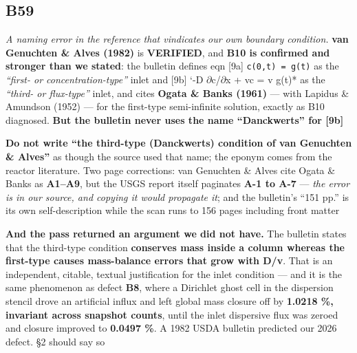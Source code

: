\documentclass[10pt]{article}
\begin{document}
\subsection*{B59}\label{led:B59}
\begin{description}[leftmargin=0pt,itemsep=1pt]
\item[Defect.] \emph{A naming error in the reference that vindicates our own boundary condition.} \textbf{van Genuchten \& Alves (1982)} is \textbf{VERIFIED}, and \textbf{B10 is confirmed and stronger than we stated}: the bulletin defines eqn [9a] \texttt{c(0,t) = g(t)} as the \emph{``first- or concentration-type''} inlet and [9b] `-D $\partial$c/$\partial$x + vc = v g(t)* as the \emph{``third- or flux-type''} inlet, and cites \textbf{Ogata \& Banks (1961)} --- with Lapidus \& Amundson (1952) --- for the first-type semi-infinite solution, exactly as B10 diagnosed. \textbf{But the bulletin never uses the name ``Danckwerts'' for [9b]}
\item[Resolution.] \textbf{Do not write ``the third-type (Danckwerts) condition of van Genuchten \& Alves''} as though the source used that name; the eponym comes from the reactor literature. Two page corrections: van Genuchten \& Alves cite Ogata \& Banks as \textbf{A1--A9}, but the USGS report itself paginates \textbf{A-1 to A-7} --- \emph{the error is in our source, and copying it would propagate it}; and the bulletin's ``151 pp.'' is its own self-description while the scan runs to 156 pages including front matter
\item[Note.] \textbf{And the pass returned an argument we did not have.} The bulletin states that the third-type condition \textbf{conserves mass inside a column whereas the first-type causes mass-balance errors that grow with D/v}. That is an independent, citable, textual justification for the inlet condition --- and it is the same phenomenon as defect \textbf{B8}, where a Dirichlet ghost cell in the dispersion stencil drove an artificial influx and left global mass closure off by \textbf{1.0218 \%, invariant across snapshot counts}, until the inlet dispersive flux was zeroed and closure improved to \textbf{0.0497 \%}. A 1982 USDA bulletin predicted our 2026 defect. §2 should say so
\end{description}
\end{document}
